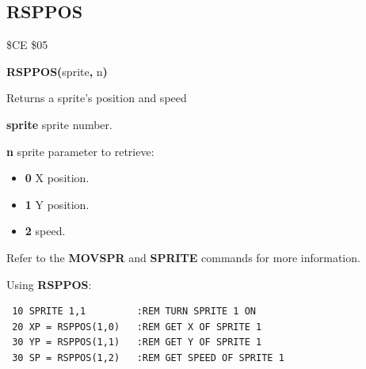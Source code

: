 \subsection{RSPPOS}
\begin{description}[leftmargin=2cm,style=nextline]
\item [Token:] \$CE \$05
\item [Format:] {\bf RSPPOS(}sprite{\bf,} n{\bf)}
\item [Usage:]  Returns a sprite's position and speed

                {\bf sprite} sprite number.

                {\bf n} sprite parameter to retrieve:

                \begin{itemize}
                    \item {\bf 0} X position.
                    \item {\bf 1} Y position.
                    \item {\bf 2} speed.
                \end{itemize}

\item [Remarks:] Refer to the {\bf MOVSPR} and {\bf SPRITE} commands for more information.

\item [Example:] Using {\bf RSPPOS}:
\begin{tcolorbox}[colback=black,coltext=white]
\verbatimfont{\codefont}
\begin{verbatim}
 10 SPRITE 1,1         :REM TURN SPRITE 1 ON
 20 XP = RSPPOS(1,0)   :REM GET X OF SPRITE 1
 30 YP = RSPPOS(1,1)   :REM GET Y OF SPRITE 1
 30 SP = RSPPOS(1,2)   :REM GET SPEED OF SPRITE 1
\end{verbatim}
\end{tcolorbox}
\end{description}


\newpage
